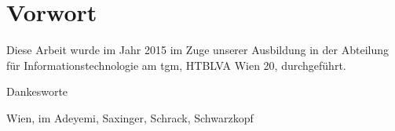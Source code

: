 

\chapter*{Vorwort}

Diese Arbeit wurde im Jahr 2015 im Zuge unserer Ausbildung in der Abteilung für Informationstechnologie am \gls{tgm}, HTBLVA Wien 20, durchgeführt. 


\bigskip

Dankesworte

\bigskip
\bigskip
\bigskip
\bigskip



Wien, im \monthdis \hfill Adeyemi, Saxinger, Schrack, Schwarzkopf \vfill
